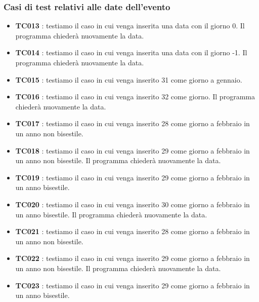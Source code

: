\documentclass[11pt]{scrartcl} %
\begin{document}
\subsubsection{Casi di test relativi alle date dell'evento}

\begin{itemize}


	\item \textbf{TC013} : testiamo il caso in cui venga inserita una data con il giorno 0. Il programma chiederà nuovamente la data.

	\item \textbf{TC014} : testiamo il caso in cui venga inserita una data con il giorno -1. Il programma chiederà nuovamente la data.

	\item \textbf{TC015} : testiamo il caso in cui venga inserito 31 come giorno a gennaio.

	\item \textbf{TC016} : testiamo il caso  in cui venga inserito 32 come giorno. Il programma chiederà nuovamente la data.

	\item \textbf{TC017} : testiamo il caso  in cui venga inserito 28 come giorno a febbraio in un anno non bisestile.

	\item \textbf{TC018} : testiamo il caso  in cui venga inserito 29 come giorno a febbraio in un anno non bisestile. Il programma chiederà nuovamente la data.

	\item \textbf{TC019} : testiamo il caso in cui venga inserito 29 come giorno a febbraio in un anno bisestile.

	\item \textbf{TC020} : testiamo il caso in cui venga inserito 30 come giorno a febbraio in un anno bisestile. Il programma chiederà nuovamente la data.

	\item \textbf{TC021} : testiamo il caso in cui venga inserito 28 come giorno a febbraio in un anno non bisestile.

	\item \textbf{TC022} : testiamo il caso in cui venga inserito 29 come giorno a febbraio in un anno non bisestile. Il programma chiederà nuovamente la data.

	\item \textbf{TC023} : testiamo il caso in cui venga inserito 29 come giorno a febbraio in un anno  bisestile.


\end{itemize}
\end{document}

